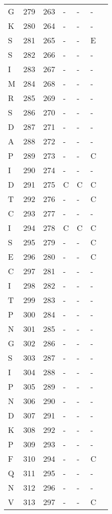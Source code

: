 \begin{longtable}{lllllll}
  G & 279 & 263 & - & - & - &  \\ 
  K & 280 & 264 & - & - & - &  \\ 
  S & 281 & 265 & - & - & E &  \\ 
  S & 282 & 266 & - & - & - &  \\ 
  I & 283 & 267 & - & - & - &  \\ 
  M & 284 & 268 & - & - & - &  \\ 
  R & 285 & 269 & - & - & - &  \\ 
  S & 286 & 270 & - & - & - &  \\ 
  D & 287 & 271 & - & - & - &  \\ 
  A & 288 & 272 & - & - & - &  \\ 
  P & 289 & 273 & - & - & C &  \\ 
  I & 290 & 274 & - & - & - &  \\ 
  D & 291 & 275 & C & C & C &  \\ 
  T & 292 & 276 & - & - & C &  \\ 
  C & 293 & 277 & - & - & - &  \\ 
  I & 294 & 278 & C & C & C &  \\ 
  S & 295 & 279 & - & - & C &  \\ 
  E & 296 & 280 & - & - & C &  \\ 
  C & 297 & 281 & - & - & - &  \\ 
  I & 298 & 282 & - & - & - &  \\ 
  T & 299 & 283 & - & - & - &  \\ 
  P & 300 & 284 & - & - & - &  \\ 
  N & 301 & 285 & - & - & - &  \\ 
  G & 302 & 286 & - & - & - &  \\ 
  S & 303 & 287 & - & - & - &  \\ 
  I & 304 & 288 & - & - & - &  \\ 
  P & 305 & 289 & - & - & - &  \\ 
  N & 306 & 290 & - & - & - &  \\ 
  D & 307 & 291 & - & - & - &  \\ 
  K & 308 & 292 & - & - & - &  \\ 
  P & 309 & 293 & - & - & - &  \\ 
  F & 310 & 294 & - & - & C &  \\ 
  Q & 311 & 295 & - & - & - &  \\ 
  N & 312 & 296 & - & - & - &  \\ 
  V & 313 & 297 & - & - & C &  \\ 

\end{longtable}
